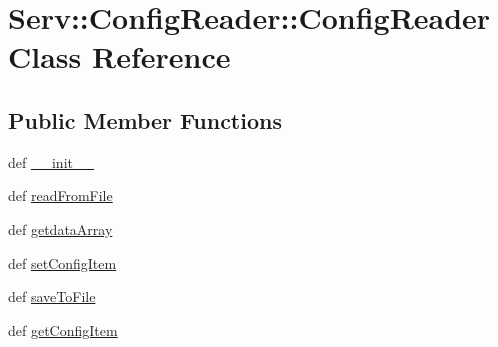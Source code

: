 \hypertarget{class_serv_1_1_config_reader_1_1_config_reader}{
\section{Serv::ConfigReader::ConfigReader Class Reference}
\label{class_serv_1_1_config_reader_1_1_config_reader}
}
\subsection*{Public Member Functions}
\begin{CompactItemize}
\item 
def \hyperlink{class_serv_1_1_config_reader_1_1_config_reader_79fcc0800606aaab1c5b4b0f2910b821}{\_\-\_\-init\_\-\_\-}
\item 
def \hyperlink{class_serv_1_1_config_reader_1_1_config_reader_c8ff5305639fac5691feb7de4ae9ceea}{readFromFile}
\item 
def \hyperlink{class_serv_1_1_config_reader_1_1_config_reader_6a032fedc46e0b5557d1124aeb5fc996}{getdataArray}
\item 
def \hyperlink{class_serv_1_1_config_reader_1_1_config_reader_44baeb28dc94ccbc797ab1164d98fa04}{setConfigItem}
\item 
def \hyperlink{class_serv_1_1_config_reader_1_1_config_reader_919cf4af7c9d0eb3a91ef578731edb0a}{saveToFile}
\item 
def \hyperlink{class_serv_1_1_config_reader_1_1_config_reader_9679117d87cde62fd4243670089a11cc}{getConfigItem}
\end{CompactItemize}
